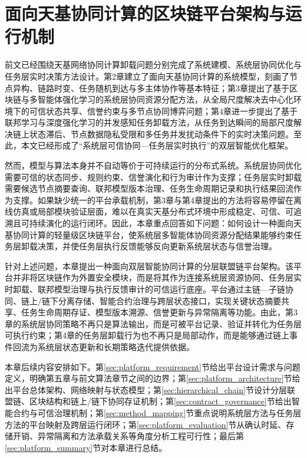 \chapter{面向天基协同计算的区块链平台架构与运行机制}
\label{chap:platform}

前文已经围绕天基网络协同计算卸载问题分别完成了系统建模、系统层协同优化与任务层实时决策方法设计。第2章建立了面向天基协同计算的系统模型，刻画了节点异构、链路时变、任务随机到达与多主体协作等基本特征；第3章提出了基于区块链与多智能体强化学习的系统层协同资源分配方法，从全局尺度解决去中心化环境下的可信状态共享、信誉约束与多节点协同博弈问题；第4章进一步提出了基于联邦学习与深度强化学习的并发感知任务卸载方法，从任务到达瞬间的局部尺度解决链上状态滞后、节点数据隐私受限和多任务并发扰动条件下的实时决策问题。至此，本文已经形成了“系统层可信协同—任务层实时执行”的双层智能优化框架。

然而，模型与算法本身并不自动等价于可持续运行的分布式系统。系统层协同优化需要可信的状态同步、规则约束、信誉演化和行为审计作为支撑；任务层实时卸载需要候选节点摘要查询、联邦模型版本治理、任务生命周期记录和执行结果回流作为支撑。如果缺少统一的平台承载机制，第3章与第4章提出的方法将容易停留在离线仿真或局部模块验证层面，难以在真实天基分布式环境中形成稳定、可信、可追溯且可持续演化的运行闭环。因此，本章重点回答如下问题：如何设计一种面向天基协同计算的轻量级区块链平台，使系统层多智能体协同资源分配结果能够约束任务层卸载决策，并使任务层执行反馈能够反向更新系统层状态与信誉治理。

针对上述问题，本章提出一种面向双层智能协同计算的分层联盟链平台架构。该平台并非将区块链作为外置安全模块，而是将其作为连接系统层资源协同、任务层实时卸载、联邦模型治理与执行反馈审计的可信运行底座。平台通过主链—子链协同、链上/链下分离存储、智能合约治理与跨层状态接口，实现关键状态摘要共享、任务生命周期存证、模型版本溯源、信誉更新与异常隔离等功能。由此，第3章的系统层协同策略不再只是算法输出，而是可被平台记录、验证并转化为任务层可执行约束；第4章的任务层卸载行为也不再只是局部动作，而是能够通过链上事件回流为系统层状态更新和长期策略迭代提供依据。

本章后续内容安排如下。第\ref{sec:platform_requirement}节给出平台设计需求与问题定义，明确第五章与前文算法章节之间的边界；第\ref{sec:platform_architecture}节给出平台总体架构、网络映射与状态模型；第\ref{sec:hierarchical_chain}节设计分层联盟链、区块结构和链上/链下协同存证机制；第\ref{sec:contract_governance}节给出智能合约与可信治理机制；第\ref{sec:method_mapping}节重点说明系统层方法与任务层方法的平台映射及跨层运行闭环；第\ref{sec:platform_evaluation}节从确认时延、存储开销、异常隔离和方法承载关系等角度分析工程可行性；最后第\ref{sec:platform_summary}节对本章进行总结。


